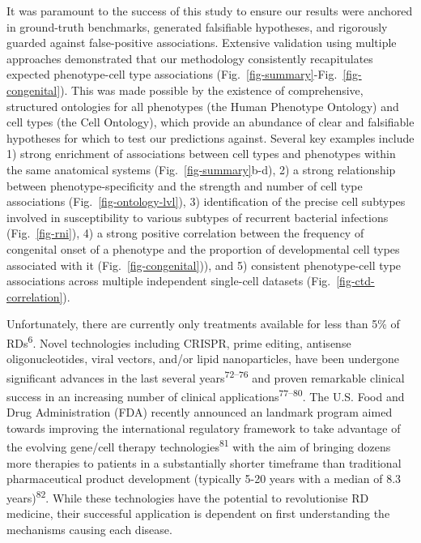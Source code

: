 \documentclass[
]{article}
\begin{document}
It was paramount to the success of this study to ensure our results were
anchored in ground-truth benchmarks, generated falsifiable hypotheses,
and rigorously guarded against false-positive associations. Extensive
validation using multiple approaches demonstrated that our methodology
consistently recapitulates expected phenotype-cell type associations
(Fig.~\ref{fig-summary}-Fig.~\ref{fig-congenital}). This was made
possible by the existence of comprehensive, structured ontologies for
all phenotypes (the Human Phenotype Ontology) and cell types (the Cell
Ontology), which provide an abundance of clear and falsifiable
hypotheses for which to test our predictions against. Several key
examples include 1) strong enrichment of associations between cell types
and phenotypes within the same anatomical systems
(Fig.~\ref{fig-summary}b-d), 2) a strong relationship between
phenotype-specificity and the strength and number of cell type
associations (Fig.~\ref{fig-ontology-lvl}), 3) identification of the
precise cell subtypes involved in susceptibility to various subtypes of
recurrent bacterial infections (Fig.~\ref{fig-rni}), 4) a strong
positive correlation between the frequency of congenital onset of a
phenotype and the proportion of developmental cell types associated with
it (Fig.~\ref{fig-congenital})), and 5) consistent phenotype-cell type
associations across multiple independent single-cell datasets
(Fig.~\ref{fig-ctd-correlation}).

Unfortunately, there are currently only treatments available for less
than 5\% of RDs\textsuperscript{6}. Novel technologies including CRISPR,
prime editing, antisense oligonucleotides, viral vectors, and/or lipid
nanoparticles, have been undergone significant advances in the last
several years\textsuperscript{72--76} and proven remarkable clinical
success in an increasing number of clinical
applications\textsuperscript{77--80}. The U.S. Food and Drug
Administration (FDA) recently announced an landmark program aimed
towards improving the international regulatory framework to take
advantage of the evolving gene/cell therapy
technologies\textsuperscript{81} with the aim of bringing dozens more
therapies to patients in a substantially shorter timeframe than
traditional pharmaceutical product development (typically 5-20 years
with a median of 8.3 years)\textsuperscript{82}. While these
technologies have the potential to revolutionise RD medicine, their
successful application is dependent on first understanding the
mechanisms causing each disease.
\end{document}
